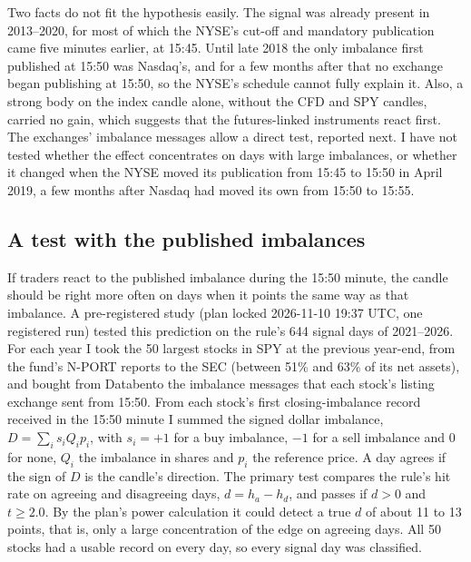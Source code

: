 \documentclass[12pt,letterpaper]{article}
\begin{document}
Two facts do not fit the hypothesis easily. The signal was already present in
2013--2020, for most of which the NYSE's cut-off and mandatory publication came
five minutes earlier, at 15:45. Until late 2018 the only imbalance first published
at 15:50 was Nasdaq's, and for a few months after that no exchange began
publishing at 15:50, so the NYSE's schedule cannot fully explain it. Also, a strong body on the index candle alone, without the CFD and SPY candles, carried
no gain, which suggests that the futures-linked instruments react first. The exchanges' imbalance messages allow a direct test, reported next. I have
not tested whether the effect concentrates on days with large imbalances, or
whether it changed when the NYSE moved its publication from 15:45 to 15:50 in
April 2019, a few months after Nasdaq had moved its own from 15:50 to 15:55.

\subsection{A test with the published imbalances}
\label{sec:imbtest}

If traders react to the published imbalance during the 15:50 minute, the candle
should be right more often on days when it points the same way as that imbalance.
A pre-registered study (plan locked 2026-11-10 19:37 UTC, one registered run)
tested this prediction on the rule's 644 signal days of 2021--2026. For each year I took the 50 largest stocks in SPY at the previous year-end, from the fund's
N-PORT reports to the SEC (between 51\% and 63\% of its net assets), and bought
from Databento the imbalance messages that each stock's listing exchange sent
from 15:50. From each stock's first closing-imbalance record received in the
15:50 minute I summed the signed dollar imbalance, $D = \sum_i s_i Q_i p_i$, with
$s_i = +1$ for a buy imbalance, $-1$ for a sell imbalance and 0 for none, $Q_i$
the imbalance in shares and $p_i$ the reference price. A day agrees if the sign
of $D$ is the candle's direction. The primary test compares the rule's hit rate
on agreeing and disagreeing days, $d = h_a - h_d$, and passes if $d > 0$ and
$t \ge 2.0$. By the plan's power calculation it could detect a true $d$ of about
11 to 13 points, that is, only a large concentration of the edge on agreeing days. All 50 stocks had a usable record on every day, so every signal day
was classified.
\end{document}
